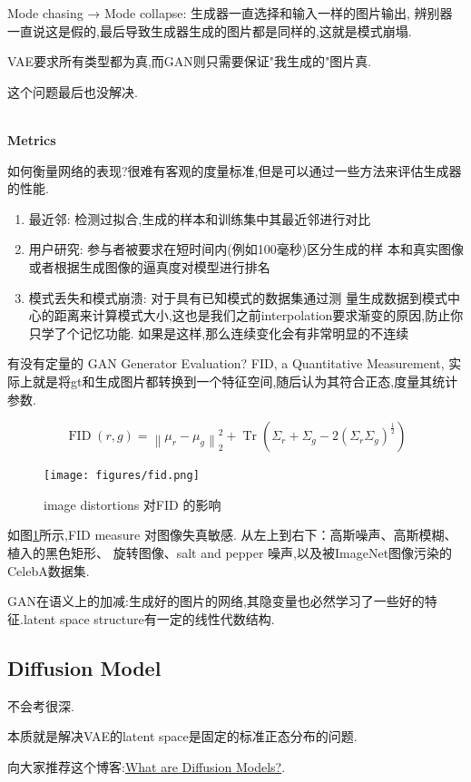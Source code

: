 	Mode chasing → Mode collapse: 生成器一直选择和输入一样的图片输出,
	辨别器一直说这是假的,最后导致生成器生成的图片都是同样的,这就是模式崩塌.

	VAE要求所有类型都为真,而GAN则只需要保证"我生成的"图片真.
	
	这个问题最后也没解决.

	\textbf{\\Metrics}

	如何衡量网络的表现?很难有客观的度量标准,但是可以通过一些方法来评估生成器的性能.
	
	\begin{enumerate}
	\item 最近邻: 检测过拟合,生成的样本和训练集中其最近邻进行对比
	\item 用户研究: 参与者被要求在短时间内(例如100毫秒)区分生成的样
	本和真实图像或者根据生成图像的逼真度对模型进行排名 
	\item 模式丢失和模式崩溃: 对于具有已知模式的数据集通过测
	量生成数据到模式中心的距离来计算模式大小,这也是我们之前interpolation要求渐变的原因,防止你只学了个记忆功能.
	如果是这样,那么连续变化会有非常明显的不连续
	\end{enumerate}
	
	有没有定量的 GAN Generator Evaluation?
	FID, a Quantitative Measurement,
	实际上就是将gt和生成图片都转换到一个特征空间,随后认为其符合正态,度量其统计参数.
	
	\begin{equation}
		\operatorname{FID}(r, g)=\left\|\mu_{r}-\mu_{g}\right\|_{2}^{2}+\operatorname{Tr}\left(\Sigma_{r}+\Sigma_{g}-2\left(\Sigma_{r} \Sigma_{g}\right)^{\frac{1}{2}}\right)
	\end{equation}

	\begin{figure}[htbp]
		\centering
		\texttt{[image: figures/fid.png]}
		\caption{image distortions 对FID 的影响}
		\label{fig:fid}
	\end{figure}

	如图\ref{fig:fid}所示,FID measure 对图像失真敏感.
	从左上到右下：高斯噪声、高斯模糊、植入的黑色矩形、
	旋转图像、salt and pepper 噪声,以及被ImageNet图像污染的CelebA数据集.
	
	GAN在语义上的加减:生成好的图片的网络,其隐变量也必然学习了一些好的特征.latent
	space structure有一定的线性代数结构.
	
	\subsection{Diffusion Model}

	不会考很深.

	本质就是解决VAE的latent space是固定的标准正态分布的问题.

	向大家推荐这个博客:\href{https://lilianweng.github.io/posts/2021-07-11-diffusion-models/}{What are Diffusion Models?}.
